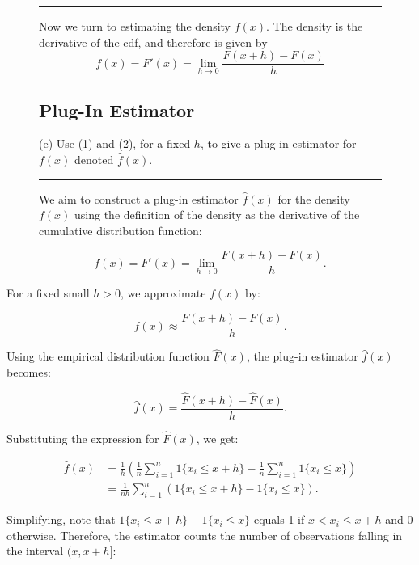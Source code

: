 \documentclass{article}
\newenvironment{colorparagraph}[1]{\par\color{#1}}{\par}
\begin{document}
\begin{figure}[H]
\begin{colorparagraph}{questioncolor}

\rule{\textwidth}{0.5pt}
Now we turn to estimating the density \( f(x) \). The density is the derivative of the cdf, and therefore is given by
\[
f(x) = F'(x) = \lim_{h \to 0} \frac{F(x + h) - F(x)}{h}
\]
\end{colorparagraph}

\begin{colorparagraph}{questioncolor}
\label{q2e}
\subsection{Plug-In Estimator}
(e) Use (1) and (2), for a fixed \( h \), to give a plug-in estimator for \( f(x) \) denoted \( \hat{f}(x) \).

\rule{\textwidth}{0.5pt}
\end{colorparagraph}

We aim to construct a plug-in estimator \( \hat{f}(x) \) for the density \( f(x) \) using the definition of the density as the derivative of the cumulative distribution function:
\end{figure}

\[
f(x) = F'(x) = \lim_{h \to 0} \frac{F(x + h) - F(x)}{h}.
\]

For a fixed small \( h > 0 \), we approximate \( f(x) \) by:

\[
f(x) \approx \frac{F(x + h) - F(x)}{h}.
\]

Using the empirical distribution function \( \hat{F}(x) \), the plug-in estimator \( \hat{f}(x) \) becomes:

\[
\hat{f}(x) = \frac{\hat{F}(x + h) - \hat{F}(x)}{h}.
\]

Substituting the expression for \( \hat{F}(x) \), we get:

\[
\begin{aligned}
\hat{f}(x) &= \frac{1}{h} \left( \frac{1}{n} \sum_{i=1}^n 1\{ x_i \leq x + h \} - \frac{1}{n} \sum_{i=1}^n 1\{ x_i \leq x \} \right) \\
&= \frac{1}{n h} \sum_{i=1}^n \left( 1\{ x_i \leq x + h \} - 1\{ x_i \leq x \} \right).
\end{aligned}
\]

Simplifying, note that \( 1\{ x_i \leq x + h \} - 1\{ x_i \leq x \} \) equals 1 if \( x < x_i \leq x + h \) and 0 otherwise. Therefore, the estimator counts the number of observations falling in the interval \( (x, x + h] \):
\end{document}
